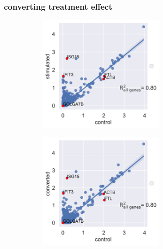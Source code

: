 \documentclass[final]{beamer}
\theoremstyle{plain}
\theoremstyle{definition}
\theoremstyle{remark}
\begin{document}
\begin{frame}
\frametitle{converting treatment effect}
\begin{figure}[h]
\centering
\begin{subfigure}[b]{0.49\textwidth}
\includegraphics[width=0.7\textwidth]{images/Kang_bcells_ctrl_stim.png}
\label{fig:Kang_bcells_ctrl_stim}
\end{subfigure}
\begin{subfigure}[b]{0.49\textwidth}
\includegraphics[width=0.7\textwidth]{images/Kang_bcells_ctrl_converted.png}
\label{fig:Kang_bcells_ctrl_converted}
\end{subfigure}
\begin{subfigure}[b]{0.49\textwidth}

\end{subfigure}
\end{figure}
\end{frame}
\end{document}

